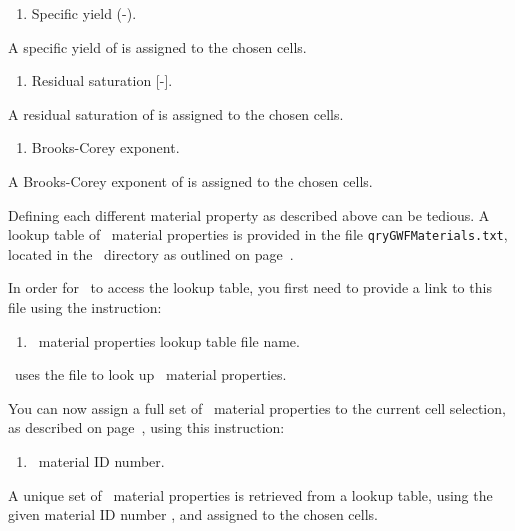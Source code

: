 {
    {
        \squish
        \begin{enumerate}
        \item {}  Specific yield (-).
        \end{enumerate}
          A specific yield of  is assigned to the chosen cells.
    }

    {
        \squish
        \begin{enumerate}
        \item {}  Residual saturation [-].
        \end{enumerate}
          A residual saturation of  is assigned to the chosen cells.
    }

    {
        \squish
        \begin{enumerate}
        \item {}  Brooks-Corey exponent.
        \end{enumerate}
          A Brooks-Corey exponent of  is assigned to the chosen cells.
    }

Defining each different material property as described above can be tedious.  A lookup table of \gwf\ material properties  is provided in the file \texttt{qryGWFMaterials.txt}, located in the \bin\ directory as outlined on page~\pageref{page:userbin}.

In order for \mut\ to access the lookup table, you first need to provide a link to this file using the instruction:

    {
        \squish
        \begin{enumerate}
        \item {}  \gwf\ material properties lookup table file name.
        \end{enumerate}
          \mut\ uses the file  to look up \gwf\ material properties.
    }

You can now assign a full set of \gwf\ material properties to the current cell selection, as described on page~\pageref{page:cellSelect}, using this instruction:

    {
        \squish
        \begin{enumerate}
        \item {}  \gwf\ material ID number.
        \end{enumerate}
          A unique set of \gwf\ material properties is retrieved from a lookup table, using the given  material ID number , and assigned to the chosen cells.
    }

}
